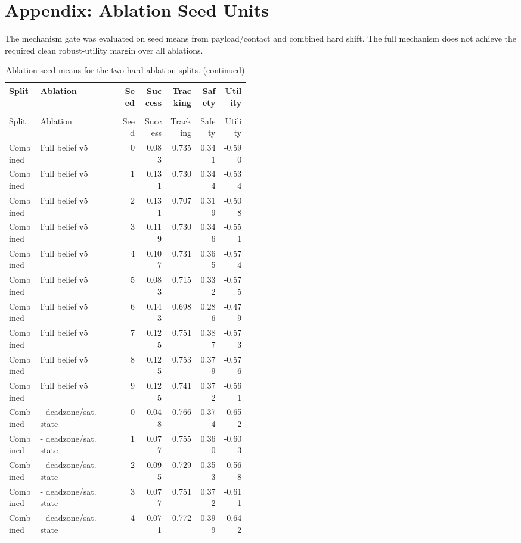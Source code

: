 \documentclass{article}
\begin{document}
\section{Appendix: Ablation Seed Units}
The mechanism gate was evaluated on seed means from payload/contact and combined hard shift. The full mechanism does not achieve the required clean robust-utility margin over all ablations.
\begin{center}
\tiny
\begin{longtable}{p{0.13\linewidth}p{0.34\linewidth}rrrrr}
\caption{Ablation seed means for the two hard ablation splits.}\label{tab:ablation-seed}\\
\toprule
Split & Ablation & Seed & Success & Tracking & Safety & Utility\\
\midrule
\endfirsthead
\caption[]{Ablation seed means for the two hard ablation splits. (continued)}\\
\toprule
Split & Ablation & Seed & Success & Tracking & Safety & Utility\\
\midrule
\endhead
Combined & Full belief v5 & 0 & 0.083 & 0.735 & 0.341 & -0.590\\
Combined & Full belief v5 & 1 & 0.131 & 0.730 & 0.344 & -0.534\\
Combined & Full belief v5 & 2 & 0.131 & 0.707 & 0.319 & -0.508\\
Combined & Full belief v5 & 3 & 0.119 & 0.730 & 0.346 & -0.551\\
Combined & Full belief v5 & 4 & 0.107 & 0.731 & 0.365 & -0.574\\
Combined & Full belief v5 & 5 & 0.083 & 0.715 & 0.332 & -0.575\\
Combined & Full belief v5 & 6 & 0.143 & 0.698 & 0.286 & -0.479\\
Combined & Full belief v5 & 7 & 0.125 & 0.751 & 0.387 & -0.573\\
Combined & Full belief v5 & 8 & 0.125 & 0.753 & 0.379 & -0.576\\
Combined & Full belief v5 & 9 & 0.125 & 0.741 & 0.372 & -0.561\\
Combined & - deadzone/sat. state & 0 & 0.048 & 0.766 & 0.374 & -0.652\\
Combined & - deadzone/sat. state & 1 & 0.077 & 0.755 & 0.360 & -0.603\\
Combined & - deadzone/sat. state & 2 & 0.095 & 0.729 & 0.353 & -0.568\\
Combined & - deadzone/sat. state & 3 & 0.077 & 0.751 & 0.372 & -0.611\\
Combined & - deadzone/sat. state & 4 & 0.071 & 0.772 & 0.399 & -0.642\\

\end{longtable}
\end{center}
\end{document}
